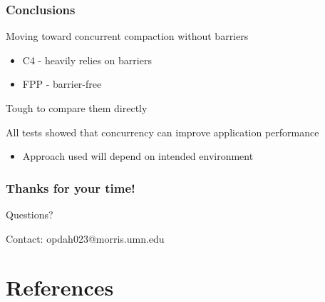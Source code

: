 \documentclass{beamer}
\newcommand{\linespace}{\vskip 0.25cm}
\begin{document}
\begin{frame}

\frametitle{Conclusions}

Moving toward concurrent compaction without barriers
\begin{itemize}
\item C4 - heavily relies on barriers
\item FPP - barrier-free
\end{itemize}

%

\linespace
\linespace

Tough to compare them directly

\linespace
\linespace

All tests showed that concurrency can improve application performance
\begin{itemize}
\item Approach used will depend on intended environment
\end{itemize}

\end{frame}

\begin{frame}
	\frametitle{Thanks for your time!}
	
	\begin{center}
	{\huge Questions?}
	\end{center}	
	
	\linespace
	\linespace	
	
	\begin{center}
	Contact: opdah023@morris.umn.edu
	\end{center}
	
\end{frame}



\section*{References}
\end{document}
